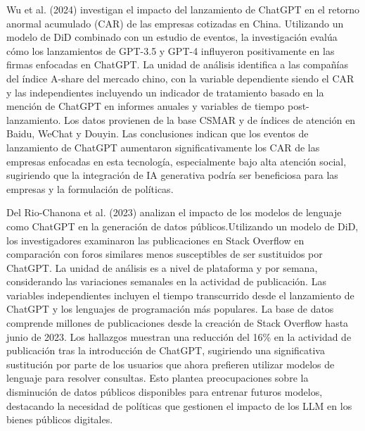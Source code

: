 \documentclass[12pt,a4paper]{article}
\begin{document}
Wu et al. (2024) investigan el impacto del lanzamiento de ChatGPT en el retorno anormal acumulado (CAR) de las empresas cotizadas en China. Utilizando un modelo de DiD combinado con un estudio de eventos, la investigación evalúa cómo los lanzamientos de GPT-3.5 y GPT-4 influyeron positivamente en las firmas enfocadas en ChatGPT. La unidad de análisis identifica a las compañías del índice A-share del mercado chino, con la variable dependiente siendo el CAR y las independientes incluyendo un indicador de tratamiento basado en la mención de ChatGPT en informes anuales y variables de tiempo post-lanzamiento. Los datos provienen de la base CSMAR y de índices de atención en Baidu, WeChat y Douyin. Las conclusiones indican que los eventos de lanzamiento de ChatGPT aumentaron significativamente los CAR de las empresas enfocadas en esta tecnología, especialmente bajo alta atención social, sugiriendo que la integración de IA generativa podría ser beneficiosa para las empresas y la formulación de políticas.

Del Rio-Chanona et al. (2023) analizan el impacto de los modelos de lenguaje como ChatGPT en la generación de datos públicos.Utilizando un modelo de DiD, los investigadores examinaron las publicaciones en Stack Overflow en comparación con foros similares menos susceptibles de ser sustituidos por ChatGPT. La unidad de análisis es a nivel de plataforma y por semana, considerando las variaciones semanales en la actividad de publicación. Las variables independientes incluyen el tiempo transcurrido desde el lanzamiento de ChatGPT y los lenguajes de programación más populares. La base de datos comprende millones de publicaciones desde la creación de Stack Overflow hasta junio de 2023. Los hallazgos muestran una reducción del 16\% en la actividad de publicación tras la introducción de ChatGPT, sugiriendo una significativa sustitución por parte de los usuarios que ahora prefieren utilizar modelos de lenguaje para resolver consultas. Esto plantea preocupaciones sobre la disminución de datos públicos disponibles para entrenar futuros modelos, destacando la necesidad de políticas que gestionen el impacto de los LLM en los bienes públicos digitales.
\end{document}
